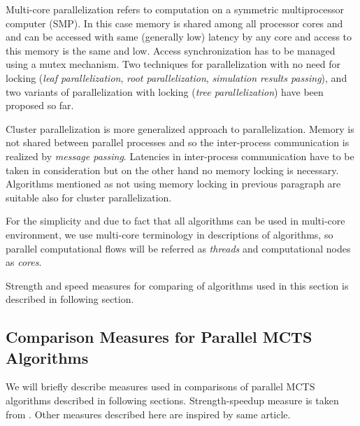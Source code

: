 Multi-core parallelization refers to computation on a symmetric multiprocessor computer (SMP). In
this case memory is shared among all processor cores and and can be accessed with same
(generally low) latency by any core  and access to this memory is the same and low.
Access synchronization has to be managed using a mutex mechanism. Two techniques for
parallelization with no need for locking (\emph{leaf parallelization}, \emph{root parallelization},
\emph{simulation results passing}),
and two variants of parallelization with locking (\emph{tree parallelization}) have been proposed so
far. 

Cluster parallelization is more generalized approach to parallelization. Memory is not shared
between parallel processes and so the inter-process communication is realized by \emph{message
passing}. Latencies in inter-process communication have to be taken in consideration but on the
other hand no memory locking is necessary. Algorithms mentioned as not using memory locking in
previous paragraph are suitable also for cluster parallelization.

For the simplicity and due to fact that all algorithms can be used in multi-core environment, we 
use multi-core terminology in descriptions of algorithms, so parallel
computational flows will be referred as \emph{threads} and computational nodes as \emph{cores}.

Strength and speed measures for comparing of algorithms used in this section is described in
following section.

\subsection{Comparison Measures for Parallel MCTS Algorithms}
\label{sec_measures_parallel}

We will briefly describe measures used in comparisons of parallel MCTS algorithms described in
following sections. Strength-speedup measure is taken from \cite{Chaslot2008}. Other measures
described here are inspired by same article.

